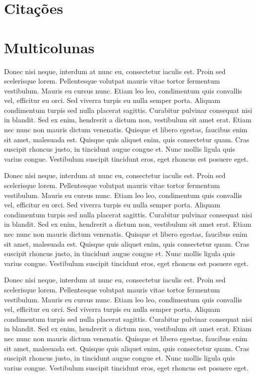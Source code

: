 \documentclass[12pt]{article}
\begin{document}
\section{Citações}



\section{Multicolunas}

\begin{multicols}{3}
	
	Donec nisi neque, interdum at nunc eu, consectetur iaculis est. Proin sed scelerisque lorem. Pellentesque volutpat mauris vitae tortor fermentum vestibulum. Mauris eu cursus nunc. Etiam leo leo, condimentum quis convallis vel, efficitur eu orci. Sed viverra turpis eu nulla semper porta. Aliquam condimentum turpis sed nulla placerat sagittis. Curabitur pulvinar consequat nisi in blandit. Sed ex enim, hendrerit a dictum non, vestibulum sit amet erat. Etiam nec nunc non mauris dictum venenatis. Quisque et libero egestas, faucibus enim sit amet, malesuada est. Quisque quis aliquet enim, quis consectetur quam. Cras suscipit rhoncus justo, in tincidunt augue congue et. Nunc mollis ligula quis varius congue. Vestibulum suscipit tincidunt eros, eget rhoncus est posuere eget.
	
	Donec nisi neque, interdum at nunc eu, consectetur iaculis est. Proin sed scelerisque lorem. Pellentesque volutpat mauris vitae tortor fermentum vestibulum. Mauris eu cursus nunc. Etiam leo leo, condimentum quis convallis vel, efficitur eu orci. Sed viverra turpis eu nulla semper porta. Aliquam condimentum turpis sed nulla placerat sagittis. Curabitur pulvinar consequat nisi in blandit. Sed ex enim, hendrerit a dictum non, vestibulum sit amet erat. Etiam nec nunc non mauris dictum venenatis. Quisque et libero egestas, faucibus enim sit amet, malesuada est. Quisque quis aliquet enim, quis consectetur quam. Cras suscipit rhoncus justo, in tincidunt augue congue et. Nunc mollis ligula quis varius congue. Vestibulum suscipit tincidunt eros, eget rhoncus est posuere eget.
	
	Donec nisi neque, interdum at nunc eu, consectetur iaculis est. Proin sed scelerisque lorem. Pellentesque volutpat mauris vitae tortor fermentum vestibulum. Mauris eu cursus nunc. Etiam leo leo, condimentum quis convallis vel, efficitur eu orci. Sed viverra turpis eu nulla semper porta. Aliquam condimentum turpis sed nulla placerat sagittis. Curabitur pulvinar consequat nisi in blandit. Sed ex enim, hendrerit a dictum non, vestibulum sit amet erat. Etiam nec nunc non mauris dictum venenatis. Quisque et libero egestas, faucibus enim sit amet, malesuada est. Quisque quis aliquet enim, quis consectetur quam. Cras suscipit rhoncus justo, in tincidunt augue congue et. Nunc mollis ligula quis varius congue. Vestibulum suscipit tincidunt eros, eget rhoncus est posuere eget.
	
\end{multicols}
\end{document}
